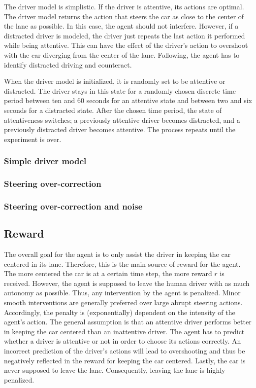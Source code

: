 The driver model is simplistic. If the driver is attentive, its actions are optimal. The driver model returns the action that steers the car as close to the center of the lane as possible. In this case, the agent should not interfere. However, if a distracted driver is modeled, the driver just repeats the last action it performed while being attentive. This can have the effect of the driver's action to overshoot with the car diverging from the center of the lane. Following, the agent has to identify distracted driving and counteract.

When the driver model is initialized, it is randomly set to be attentive or distracted. The driver stays in this state for a randomly chosen discrete time period between ten and 60 seconds for an attentive state and between two and six seconds for a distracted state. After the chosen time period, the state of attentiveness switches; a previously attentive driver becomes distracted, and a previously distracted driver becomes attentive. The process repeats until the experiment is over.

\subsubsection{Simple driver model}


\subsubsection{Steering over-correction}


\subsubsection{Steering over-correction and noise}

\subsection{Reward}

The overall goal for the agent is to only assist the driver in keeping the car centered in its lane. Therefore, this is the main source of reward for the agent. The more centered the car is at a certain time step, the more reward $r$ is received. However, the agent is supposed to leave the human driver with as much autonomy as possible. Thus, any intervention by the agent is penalized. Minor smooth interventions are generally preferred over large abrupt steering actions. Accordingly, the penalty is (exponentially) dependent on the intensity of the agent's action. The general assumption is that an attentive driver performs better in keeping the car centered than an inattentive driver. The agent has to predict whether a driver is attentive or not in order to choose its actions correctly. An incorrect prediction of the driver's actions will lead to overshooting and thus be negatively reflected in the reward for keeping the car centered. Lastly, the car is never supposed to leave the lane. Consequently, leaving the lane is highly penalized.


